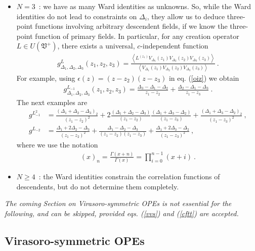 \documentclass[12pt,a4paper,notitlepage]{report}
\newcommand \la {\left\langle}
\newcommand \ra {\right\rangle}
\numberwithin{equation}{section}
\theoremstyle{break}
\begin{document}
\begin{itemize}
\item $\boxed{N=3}$\ : we have as many Ward identities as unknowns. So, while the Ward identities do not lead to constraints on $\Delta_i$, they allow us to deduce three-point functions involving arbitrary descendent fields, if we know the three-point function of primary fields. In particular, for any creation operator $L\in U(\mathfrak{V}^+)$, there exists a universal, $c$-independent function
\begin{align}
 g^{L}_{\Delta_1,\Delta_2,\Delta_3}(z_1,z_2,z_3) = \frac{\la L^{(z_1)} V_{\Delta_1}(z_1)V_{\Delta_2}(z_2)V_{\Delta_3}(z_3)\ra}{\la V_{\Delta_1}(z_1)V_{\Delta_2}(z_2)V_{\Delta_3}(z_3)\ra } \ .
\label{lzgz}
\end{align}
For example, using $\epsilon(z)=(z-z_2)(z-z_3)$ in eq. (\ref{oiz}) we obtain 
\begin{align}
 g^{L_{-1}}_{\Delta_1,\Delta_2,\Delta_3}(z_1,z_2,z_3) = \frac{\Delta_3-\Delta_1-\Delta_2}{z_1-z_2} +\frac{\Delta_2-\Delta_1-\Delta_3}{z_1-z_3}\ .
\label{glp}
\end{align}
The next examples are 
\begin{align}
 g^{L_{-1}^2} &= \frac{(\Delta_1+\Delta_2-\Delta_3)_2}{(z_1-z_2)^2} + 2\frac{(\Delta_1+\Delta_2-\Delta_3)}{(z_1-z_2)}\frac{(\Delta_1+\Delta_3-\Delta_2)}{(z_1-z_3)} + \frac{(\Delta_1+\Delta_3-\Delta_2)_2}{(z_1-z_3)^2}\ ,
\label{gloo}
\\
 g^{L_{-2}} & = \frac{\Delta_1+2\Delta_2-\Delta_3}{(z_1-z_2)^2} +\frac{\Delta_1-\Delta_2-\Delta_3}{(z_1-z_2)(z_1-z_3)} + \frac{\Delta_1+2\Delta_3-\Delta_2}{(z_1-z_3)^2}\ ,
\label{glt}
\end{align}
where we use the notation
\begin{align}
 (x)_n = \frac{\Gamma(x+n)}{\Gamma(x)} = \prod_{i=0}^{n-1}(x+i)\ .
\label{xn}
\end{align}
\item $\boxed{N\geq 4}$\ : the Ward identities constrain the correlation functions of descendents, but do not determine them completely.
\end{itemize}

\vspace{2mm} 

\textit{The coming Section on Virasoro-symmetric OPEs is not essential for the following, and can be skipped, provided eqs. (\ref{vvs}) and (\ref{cftt}) are accepted.}

\subsection{Virasoro-symmetric OPEs \label{secope}}
\end{document}
